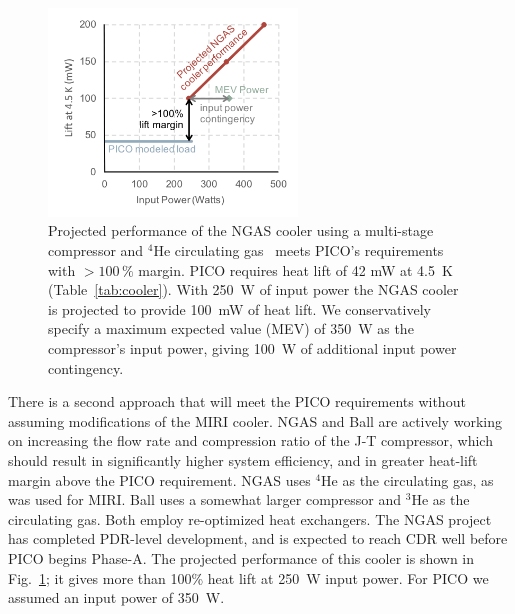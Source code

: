 \begin{figure}
\parbox{3.5in}{\centering 
\includegraphics[width=2.6in]{figures/CoolerFigure.png} }
\parbox{3.0in}{
\caption{\captiontext 
Projected performance of the NGAS cooler using a multi-stage
compressor and $^4$He circulating gas~\citep{Rabb2013} meets PICO's requirements
with $>100\,\%$ margin. PICO requires heat lift of 42 mW at 4.5~K (Table~\ref{tab:cooler}). With 250~W of input power the NGAS cooler is projected to provide 100~mW of heat lift. We conservatively specify a maximum expected value (MEV) of 350~W as the compressor's input power, giving 100~W of additional input power contingency.
  \label{fig:CoolerFigure}} }
\vspace{-0.15in}
\end{figure}

There is a second approach that will meet the PICO requirements without assuming modifications of the MIRI cooler. 
NGAS and Ball are actively working on increasing the flow rate and compression ratio of the J-T compressor,  which should result in significantly higher system efficiency, and in greater heat-lift margin above the PICO requirement. NGAS uses $^4$He as the circulating gas, as was used for MIRI. Ball uses a somewhat larger compressor and $^3$He as the circulating gas. Both employ re-optimized heat exchangers. 
The NGAS project has completed PDR-level development, and is expected to reach CDR well before PICO begins Phase-A. The projected performance of this cooler is shown in Fig.~\ref{fig:CoolerFigure}; it gives more than 100\% heat lift at 250~W input power. For PICO we assumed an input power of 350~W. 



